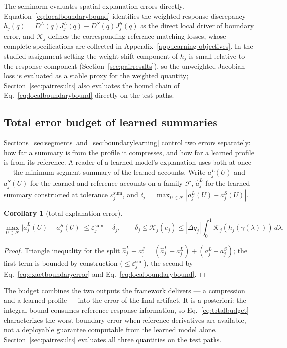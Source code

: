 \documentclass[a4paper,fleqn]{cas-sc}
\newtheorem{corollary}[theorem]{Corollary}
\begin{document}
The seminorm evaluates spatial explanation errors directly.
Equation~\eqref{eq:localboundarybound} identifies the weighted response
discrepancy $h_j(q)=D^L(q)J_j^L(q)-D^S(q)J_j^S(q)$ as the direct local
driver of boundary error, and $\mathcal K_j$ defines the corresponding
reference-matching losses, whose complete specifications are collected
in Appendix~\ref{app:learning-objectives}. In the studied assignment
setting the weight-shift component of $h_j$ is small relative to the
response component (Section~\ref{sec:pairresults}), so the unweighted
Jacobian loss is evaluated as a stable proxy for the weighted quantity;
Section~\ref{sec:pairresults} also evaluates the bound chain of
Eq.~\eqref{eq:localboundarybound} directly on the test paths.

\subsection{Total error budget of learned summaries}\label{sec:totalbudget}
Sections~\ref{sec:segments} and~\ref{sec:boundarylearning} control two
errors separately: how far a summary is from the profile it compresses,
and how far a learned profile is from its reference. A reader of a
learned model's explanation uses both at once --- the minimum-segment
summary of the learned accounts. Write $a_j^L(U)$ and $a_j^S(U)$ for
the learned and reference accounts on a family $\mathcal F$,
$\hat a_j^L$ for the learned summary constructed at tolerance
$\varepsilon^{\mathrm{sum}}_j$, and
$\delta_j=\max_{U\in\mathcal F}|a_j^L(U)-a_j^S(U)|$.
\begin{corollary}[total explanation error]\label{cor:totalbudget}
\begin{equation}
\max_{U\in\mathcal F}\bigl|\hat a_j^L(U)-a_j^S(U)\bigr|
\le\varepsilon^{\mathrm{sum}}_j+\delta_j,
\qquad
\delta_j\le\mathcal K_j(e_j)\le|\Delta q_j|\int_0^1\mathcal K_j(h_j(\gamma(\lambda)))\,d\lambda.
\label{eq:totalbudget}
\end{equation}
\end{corollary}
\begin{proof}
Triangle inequality for the split
$\hat a_j^L-a_j^S=(\hat a_j^L-a_j^L)+(a_j^L-a_j^S)$; the first term is
bounded by construction ($\le\varepsilon^{\mathrm{sum}}_j$), the second by
Eq.~\eqref{eq:exactboundaryerror} and Eq.~\eqref{eq:localboundarybound}.
\end{proof}
The budget combines the two outputs the framework delivers --- a
compression and a learned profile --- into the error of the final
artifact. It is a posteriori: the integral bound consumes
reference-response information, so Eq.~\eqref{eq:totalbudget}
characterizes the worst boundary error when reference derivatives are
available, not a deployable guarantee computable from the learned model
alone. Section~\ref{sec:pairresults} evaluates all three quantities on
the test paths.
\end{document}
